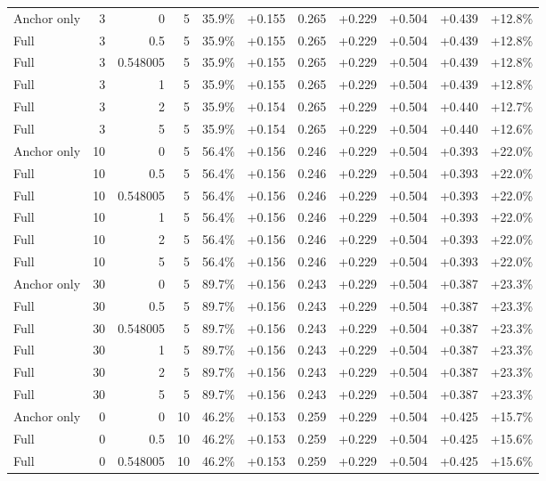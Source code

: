 \begin{table}[htbp]
\begin{tabular}{lrrrccccccc}
Anchor only & 3 & 0 & 5 & 35.9\% & +0.155 & 0.265 & +0.229 & +0.504 & +0.439 & +12.8\% \\
Full & 3 & 0.5 & 5 & 35.9\% & +0.155 & 0.265 & +0.229 & +0.504 & +0.439 & +12.8\% \\
Full & 3 & 0.548005 & 5 & 35.9\% & +0.155 & 0.265 & +0.229 & +0.504 & +0.439 & +12.8\% \\
Full & 3 & 1 & 5 & 35.9\% & +0.155 & 0.265 & +0.229 & +0.504 & +0.439 & +12.8\% \\
Full & 3 & 2 & 5 & 35.9\% & +0.154 & 0.265 & +0.229 & +0.504 & +0.440 & +12.7\% \\
Full & 3 & 5 & 5 & 35.9\% & +0.154 & 0.265 & +0.229 & +0.504 & +0.440 & +12.6\% \\
Anchor only & 10 & 0 & 5 & 56.4\% & +0.156 & 0.246 & +0.229 & +0.504 & +0.393 & +22.0\% \\
Full & 10 & 0.5 & 5 & 56.4\% & +0.156 & 0.246 & +0.229 & +0.504 & +0.393 & +22.0\% \\
Full & 10 & 0.548005 & 5 & 56.4\% & +0.156 & 0.246 & +0.229 & +0.504 & +0.393 & +22.0\% \\
Full & 10 & 1 & 5 & 56.4\% & +0.156 & 0.246 & +0.229 & +0.504 & +0.393 & +22.0\% \\
Full & 10 & 2 & 5 & 56.4\% & +0.156 & 0.246 & +0.229 & +0.504 & +0.393 & +22.0\% \\
Full & 10 & 5 & 5 & 56.4\% & +0.156 & 0.246 & +0.229 & +0.504 & +0.393 & +22.0\% \\
Anchor only & 30 & 0 & 5 & 89.7\% & +0.156 & 0.243 & +0.229 & +0.504 & +0.387 & +23.3\% \\
Full & 30 & 0.5 & 5 & 89.7\% & +0.156 & 0.243 & +0.229 & +0.504 & +0.387 & +23.3\% \\
Full & 30 & 0.548005 & 5 & 89.7\% & +0.156 & 0.243 & +0.229 & +0.504 & +0.387 & +23.3\% \\
Full & 30 & 1 & 5 & 89.7\% & +0.156 & 0.243 & +0.229 & +0.504 & +0.387 & +23.3\% \\
Full & 30 & 2 & 5 & 89.7\% & +0.156 & 0.243 & +0.229 & +0.504 & +0.387 & +23.3\% \\
Full & 30 & 5 & 5 & 89.7\% & +0.156 & 0.243 & +0.229 & +0.504 & +0.387 & +23.3\% \\
Anchor only & 0 & 0 & 10 & 46.2\% & +0.153 & 0.259 & +0.229 & +0.504 & +0.425 & +15.7\% \\
Full & 0 & 0.5 & 10 & 46.2\% & +0.153 & 0.259 & +0.229 & +0.504 & +0.425 & +15.6\% \\
Full & 0 & 0.548005 & 10 & 46.2\% & +0.153 & 0.259 & +0.229 & +0.504 & +0.425 & +15.6\% \\

\end{tabular}
\end{table}

